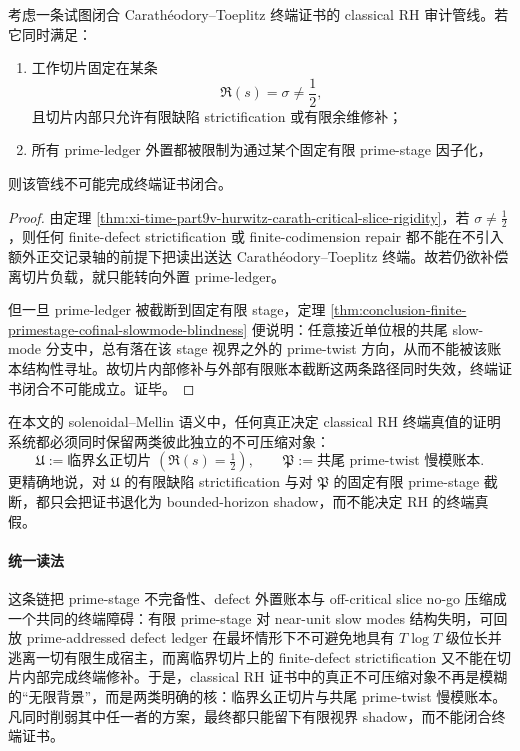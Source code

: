 \begin{theorem}[离临界切片与有限账本的双重 no-go]\label{thm:conclusion-offcritical-slice-finite-ledger-double-nogo}
考虑一条试图闭合 Carath\'eodory--Toeplitz 终端证书的 classical RH 审计管线。若它同时满足：
\begin{enumerate}
  \item 工作切片固定在某条
  \[
  \Re(s)=\sigma\neq \frac12,
  \]
  且切片内部只允许有限缺陷 strictification 或有限余维修补；
  \item 所有 prime-ledger 外置都被限制为通过某个固定有限 prime-stage 因子化，
\end{enumerate}
则该管线不可能完成终端证书闭合。
\end{theorem}
\begin{proof}
由定理 \ref{thm:xi-time-part9v-hurwitz-carath-critical-slice-rigidity}，若 \(\sigma\neq \tfrac12\)，则任何 finite-defect strictification 或 finite-codimension repair 都不能在不引入额外正交记录轴的前提下把读出送达 Carath\'eodory--Toeplitz 终端。故若仍欲补偿离切片负载，就只能转向外置 prime-ledger。

但一旦 prime-ledger 被截断到固定有限 stage，定理 \ref{thm:conclusion-finite-primestage-cofinal-slowmode-blindness} 便说明：任意接近单位根的共尾 slow-mode 分支中，总有落在该 stage 视界之外的 prime-twist 方向，从而不能被该账本结构性寻址。故切片内部修补与外部有限账本截断这两条路径同时失效，终端证书闭合不可能成立。证毕。
\end{proof}

\begin{conjecture}\label{conj:conclusion-classical-rh-dual-incompressible-cores}
在本文的 solenoidal--Mellin 语义中，任何真正决定 classical RH 终端真值的证明系统都必须同时保留两类彼此独立的不可压缩对象：
\[
\mathfrak U:=\text{临界幺正切片 }(\Re(s)=\tfrac12),
\qquad
\mathfrak P:=\text{共尾 prime-twist 慢模账本}.
\]
更精确地说，对 \(\mathfrak U\) 的有限缺陷 strictification 与对 \(\mathfrak P\) 的固定有限 prime-stage 截断，都只会把证书退化为 bounded-horizon shadow，而不能决定 RH 的终端真假。
\end{conjecture}

\paragraph{统一读法}
这条链把 prime-stage 不完备性、defect 外置账本与 off-critical slice no-go 压缩成一个共同的终端障碍：有限 prime-stage 对 near-unit slow modes 结构失明，可回放 prime-addressed defect ledger 在最坏情形下不可避免地具有 \(T\log T\) 级位长并逃离一切有限生成宿主，而离临界切片上的 finite-defect strictification 又不能在切片内部完成终端修补。于是，classical RH 证书中的真正不可压缩对象不再是模糊的“无限背景”，而是两类明确的核：临界幺正切片与共尾 prime-twist 慢模账本。凡同时削弱其中任一者的方案，最终都只能留下有限视界 shadow，而不能闭合终端证书。

\endinput
